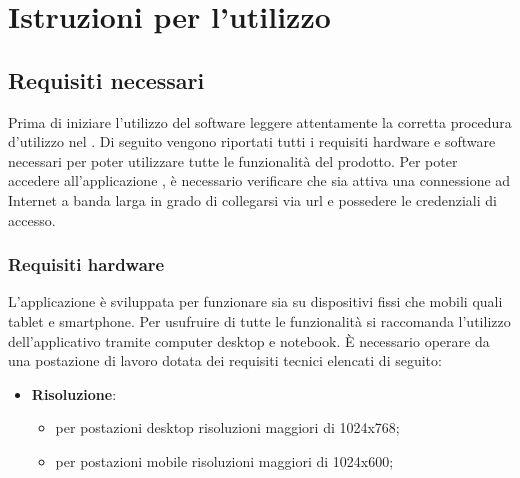 %

\section{Istruzioni per l'utilizzo} %
\label{sec:istruzioni_per_l_utilizzo}


	\subsection{Requisiti necessari} %
	\label{sec:requisiti_necessari}
		Prima di iniziare l'utilizzo del software \projectName{} leggere attentamente la corretta procedura d'utilizzo nel \docNameVersionMU.\newline
		Di seguito vengono riportati tutti i requisiti hardware e software necessari per poter utilizzare tutte le funzionalità del prodotto.\newline
		Per poter accedere all'applicazione \projectName, è necessario verificare che sia attiva una connessione ad Internet a banda larga in grado di collegarsi via url e possedere le credenziali di accesso.


		\subsubsection{Requisiti hardware} %
		\label{sec:requisiti_hardware}
			L'applicazione è sviluppata per funzionare sia su dispositivi fissi che mobili quali tablet e smartphone.\newline
			Per usufruire di tutte le funzionalità si raccomanda l'utilizzo dell'applicativo tramite computer desktop e notebook.\newline
			È necessario operare da una postazione di lavoro dotata dei requisiti tecnici elencati di seguito:
			\begin{itemize}
				\item \textbf{Risoluzione}:
				\begin{itemize}
					\item per postazioni desktop risoluzioni maggiori di 1024x768;
					\item per postazioni mobile risoluzioni maggiori di 1024x600;
				\end{itemize}
			\end{itemize}


